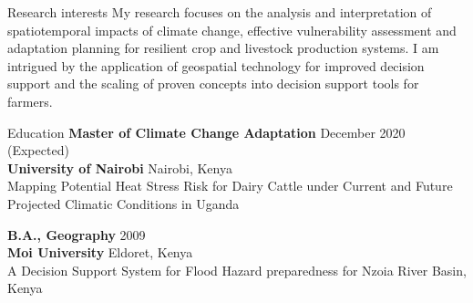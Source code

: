 \documentclass{resume} %
\begin{document}
\begin{rSection}{Research interests}
My research focuses on the analysis and interpretation of spatiotemporal impacts of climate change, effective vulnerability assessment and adaptation planning for resilient crop and livestock production systems. I am intrigued by the application of geospatial technology for improved decision support and the scaling of proven concepts into decision support tools for farmers.
\end{rSection}


\begin{rSection}{Education}
{\bf Master of Climate Change Adaptation} \hfill December 2020 (Expected)\\ 
{\bf University of Nairobi} \hfill Nairobi, Kenya \\
{Mapping Potential Heat Stress Risk for Dairy Cattle under Current and Future Projected Climatic Conditions in Uganda} \smallskip 

{\bf B.A., Geography} \hfill  2009 \\
{\bf Moi University} \hfill Eldoret, Kenya \\
{A Decision Support System for Flood Hazard preparedness for Nzoia River Basin, Kenya}
\smallskip 
\end{rSection}

\end{document}
